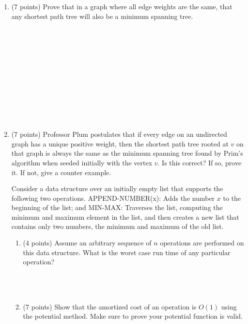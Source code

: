 \documentclass[11pt]{article}
\begin{document}
\begin{enumerate}
 
 
 
 \begin{enumerate}
 \item (7 points) Prove that in a graph where all edge weights are the same, that any shortest path tree will also be a minimum spanning tree.
 
 \ \\ \ \\ \ \\ \ \\ \ \\ \ \\ \ \\ \ \\ \ \\ \ \\
  
\pagebreak
 
 \item (7 points) Professor Plum postulates that if every edge on an undirected graph has a unique positive weight, then the shortest path tree rooted at $v$ on that graph is always the same as the minimum spanning tree found by Prim's algorithm when seeded initially with the vertex $v$.  Is this correct?  If so, prove it.  If not, give a counter example.

\pagebreak

Consider a data structure over an initially empty list that supports the following two operations.  APPEND-NUMBER(x): Adds the number $x$ to the beginning of the list; and MIN-MAX: Traverses the list, computing the minimum and maximum element in the list, and then creates a new list that contains only two numbers, the minimum and maximum of the old list. 

\begin{enumerate}
\item (4 points) Assume an arbitrary sequence of $n$ operations are performed on this data structure.  What is the worst case run time of any particular operation? 
\ \\ \ \\ \ \\ \ \\
\item (7 points) Show that the amortized cost of an operation is $O(1)$ using the potential method.  Make sure to prove your potential function is valid.

\end{enumerate}
 

\end{enumerate}
\end{enumerate}
\end{document}

